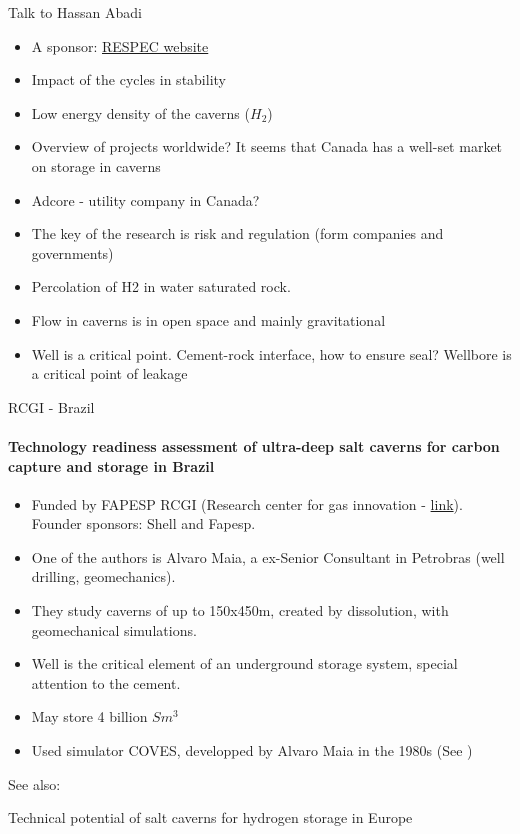 \begin{frame}[shrink=20,fragile]{Talk to Hassan Abadi}
\begin{itemize}
\item A sponsor: \href{https://www.respec.com/market/energy/caverns-hydrogen-underground-storage/}{RESPEC website}
\item Impact of the cycles in stability
\item Low energy density of the caverns ($H_2$)
\item Overview of projects worldwide? It seems that Canada has a well-set market on storage in caverns
\item Adcore - utility company in Canada?
\item The key of the research is risk and regulation (form companies and governments)
\item Percolation of H2 in water saturated rock.
\item Flow in caverns is in open space and mainly gravitational
\item Well is a critical point. Cement-rock interface, how to ensure seal? Wellbore is a critical point of leakage
\end{itemize}
\end{frame}

\begin{frame}{RCGI - Brazil}
\framesubtitle{\cite{goulart20} Technology readiness assessment of ultra-deep salt caverns for carbon capture and storage in Brazil}
\begin{itemize}
\item Funded by FAPESP RCGI (Research center for gas innovation - \href{https://sites.usp.br/rcgi/br/rgci_br/}{link}). Founder sponsors: Shell and Fapesp.
\item One of the authors is Alvaro Maia, a ex-Senior Consultant in Petrobras (well drilling, geomechanics).
\item They study caverns of up to 150x450m, created by dissolution, with geomechanical simulations.
\item Well is the critical element of an underground storage system, special attention to the cement.
\item May store 4 billion $Sm^3$
\item Used simulator COVES, developped by Alvaro Maia in the 1980s (See \cite{maia1984})
\end{itemize}
See also: \cite{abreu23}
\end{frame}
%
%
\begin{frame}{\cite{caglayan2020}Technical potential of salt caverns for hydrogen storage in Europe}
\end{frame}


